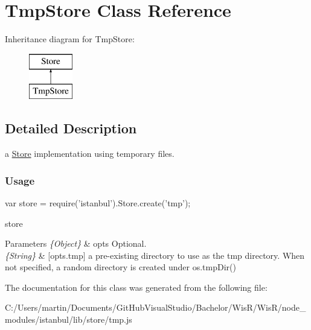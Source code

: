 \hypertarget{class_tmp_store}{}\section{Tmp\+Store Class Reference}
\label{class_tmp_store}
Inheritance diagram for Tmp\+Store\+:\begin{figure}[H]
\begin{center}
\leavevmode
\includegraphics[height=2.000000cm]{class_tmp_store}
\end{center}
\end{figure}


\subsection{Detailed Description}
a {\ttfamily \hyperlink{class_store}{Store}} implementation using temporary files.

\subsubsection*{Usage }

\begin{DoxyVerb} var store = require('istanbul').Store.create('tmp');
\end{DoxyVerb}


store 
\begin{DoxyParams}{Parameters}
{\em \{\+Object\}} & opts Optional. \\
\hline
{\em \{\+String\}} & \mbox{[}opts.\+tmp\mbox{]} a pre-\/existing directory to use as the {\ttfamily tmp} directory. When not specified, a random directory is created under {\ttfamily os.\+tmp\+Dir()}  \\
\hline
\end{DoxyParams}


The documentation for this class was generated from the following file\+:\begin{DoxyCompactItemize}
\item 
C\+:/\+Users/martin/\+Documents/\+Git\+Hub\+Visual\+Studio/\+Bachelor/\+Wis\+R/\+Wis\+R/node\+\_\+modules/istanbul/lib/store/tmp.\+js\end{DoxyCompactItemize}
